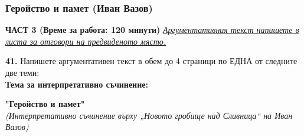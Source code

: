 \documentclass[12pt,a4paper]{article}
\begin{document}
\subsubsection{Геройство и памет (Иван Вазов)}
\vspace{0.5cm}
\begin{center}
\textbf{ЧАСТ 3 (Време за работа: 120 минути)}
\vspace{0.2cm}
{\textit{\underline{Аргументативния текст напишете в листа за отговори на предвиденото място.}}}
\vspace{0.1cm}
\end{center}
\textbf{41.} Напишете аргументативен текст в обем до 4 страници по ЕДНА от следните две теми:
\\
\vspace{0.2cm}
\textbf{Тема за интерпретативно съчинение:}
\vspace{0.1cm}
\begin{center}
\textbf{"Геройство и памет"}
\\
\textit{(Интерпретативно съчинение върху „Новото гробище над Сливница“ на Иван Вазов)}
\end{center}
\end{document}
